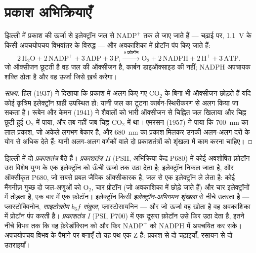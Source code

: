 \section{प्रकाश अभिक्रियाएँ}

\begin{proposition}[प्रकाश अभिक्रियाएँ क्या करती हैं]\label{prop:b1:photosynthesis:lightreactions}
 झिल्ली में प्रकाश की ऊर्जा से इलेक्ट्रॉन जल से
$\mathrm{NADP^+}$ तक ले जाए जाते हैं --- चढ़ाई पर, \qty{1.1}{V} के किसी
अपचयोपचय विभवांतर के विरुद्ध --- और अवकाशिका में प्रोटॉन पंप किए जाते हैं:
\[
2\,\mathrm{H_2O} + 2\,\mathrm{NADP^+} + 3\,\mathrm{ADP} + 3\,\mathrm{P_i}
\xrightarrow{\ 8\ \text{फ़ोटॉन}\ }
\mathrm{O_2} + 2\,\mathrm{NADPH} + 2\,\mathrm{H^+} + 3\,\mathrm{ATP} .
\]
जो ऑक्सीजन छूटती है वह जल की ऑक्सीजन है, कार्बन डाइऑक्साइड की नहीं;
NADPH अपचायक शक्ति ढोता है और  वह ऊर्जा जिसे  ख़र्च
करेगा।
\end{proposition}
\begin{proof}[साक्ष्य]
हिल (1937) ने दिखाया कि प्रकाश में अलग किए गए  $\mathrm{CO_2}$ के
बिना भी ऑक्सीजन छोड़ते हैं यदि कोई कृत्रिम इलेक्ट्रॉन ग्राही उपस्थित हो:
यानी जल का टूटना कार्बन-स्थिरीकरण से अलग किया जा सकता है।
रूबेन और केमन (1941) ने शैवालों को भारी ऑक्सीजन से चिह्नित जल खिलाया और
चिह्न छूटी हुई $\mathrm{O_2}$ में पाया, और तब नहीं जब चिह्न
$\mathrm{CO_2}$ में था। एमरसन (1957) ने पाया कि \qty{700}{nm} का लाल
प्रकाश, जो अकेले लगभग बेकार है, और \qty{680}{nm} का प्रकाश
मिलकर उनकी अलग-अलग दरों के योग से अधिक देते हैं: यानी अलग-अलग वर्णकों वाले
दो प्रकाशतंत्रों को शृंखला में काम करना चाहिए।
\end{proof}

\begin{definition}[प्रकाशतंत्र और Z-योजना]\label{def:b1:photosynthesis:zscheme}
 झिल्ली में दो \emph{प्रकाशतंत्र} बैठे हैं।
\emph{प्रकाशतंत्र II} (PSII, अभिक्रिया केंद्र P680) में कोई अवशोषित
फ़ोटॉन उस विशेष युग्म के एक इलेक्ट्रॉन को ऊँची ऊर्जा तक उठा देता है;
इलेक्ट्रॉन निकल जाता है, और ऑक्सीकृत P680, जो सबसे प्रबल जैविक ऑक्सीकारक
है, जल से एक इलेक्ट्रॉन ले लेता है: कोई मैंगनीज़ गुच्छ दो जल-अणुओं को
$\mathrm{O_2}$, चार प्रोटॉन (जो अवकाशिका में छोड़े जाते हैं)
और चार इलेक्ट्रॉनों में तोड़ता है, एक बार में एक फ़ोटॉन। इलेक्ट्रॉन किसी
\emph{इलेक्ट्रॉन-अभिगमन शृंखला} से नीचे उतरता है --- प्लास्टोक्विनोन,
\emph{साइटोक्रोम $b_6f$ संकुल}, प्लास्टोसायनिन --- और जो ऊर्जा वह खोता है
वह अवकाशिका में प्रोटॉन पंप करती है। \emph{प्रकाशतंत्र I} (PSI,
P700) में एक दूसरा फ़ोटॉन उसे फिर उठा देता है, इतने नीचे विभव तक कि वह
फ़ेरेडॉक्सिन को और फिर $\mathrm{NADP^+}$ को NADPH में अपचयित कर सके।
अपचयोपचय विभव के पैमाने पर बनाएँ तो यह पथ एक Z है: प्रकाश से दो चढ़ाइयाँ,
रसायन से दो उतराइयाँ।
\end{definition}

